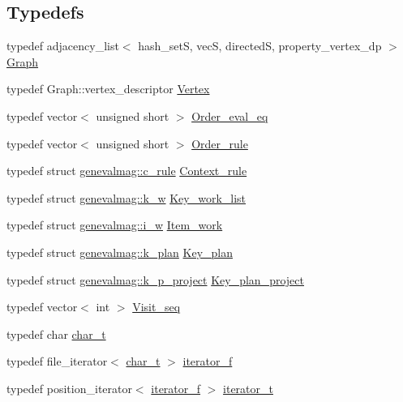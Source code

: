 \subsection*{Typedefs}
\begin{CompactItemize}
\item 
typedef adjacency\_\-list$<$ hash\_\-setS, vecS, directedS, property\_\-vertex\_\-dp $>$ \hyperlink{namespacegenevalmag_4a96de9ebfc7d48233406ab9cad55cb5}{Graph}
\item 
typedef Graph::vertex\_\-descriptor \hyperlink{namespacegenevalmag_2aae7b018fc2a9afae131bbf639181b5}{Vertex}
\item 
typedef vector$<$ unsigned short $>$ \hyperlink{namespacegenevalmag_0bb2e8b0fa1b07b873f0363719de7b64}{Order\_\-eval\_\-eq}
\item 
typedef vector$<$ unsigned short $>$ \hyperlink{namespacegenevalmag_ed20da32fb9692645ae53d911d274fd5}{Order\_\-rule}
\item 
typedef struct \hyperlink{structgenevalmag_1_1c__rule}{genevalmag::c\_\-rule} \hyperlink{namespacegenevalmag_59ad19d59075a158ceb18d55009ce9a7}{Context\_\-rule}
\item 
typedef struct \hyperlink{structgenevalmag_1_1k__w}{genevalmag::k\_\-w} \hyperlink{namespacegenevalmag_457ae083d404303792f6086cf82a1c59}{Key\_\-work\_\-list}
\item 
typedef struct \hyperlink{structgenevalmag_1_1i__w}{genevalmag::i\_\-w} \hyperlink{namespacegenevalmag_bb601d42781f0764762a8e5a8ded19c6}{Item\_\-work}
\item 
typedef struct \hyperlink{structgenevalmag_1_1k__plan}{genevalmag::k\_\-plan} \hyperlink{namespacegenevalmag_9cb3d5a3c6e368bf7a12efbc09f71048}{Key\_\-plan}
\item 
typedef struct \hyperlink{structgenevalmag_1_1k__p__project}{genevalmag::k\_\-p\_\-project} \hyperlink{namespacegenevalmag_ce502fedfb5a14e31d5d20b0d35b807d}{Key\_\-plan\_\-project}
\item 
typedef vector$<$ int $>$ \hyperlink{namespacegenevalmag_7720677d79b33ecca4db21cdbcf7908f}{Visit\_\-seq}
\item 
typedef char \hyperlink{namespacegenevalmag_63d49b2e7b123ae54a8fdc03bcbde116}{char\_\-t}
\item 
typedef file\_\-iterator$<$ \hyperlink{namespacegenevalmag_63d49b2e7b123ae54a8fdc03bcbde116}{char\_\-t} $>$ \hyperlink{namespacegenevalmag_068de0c39bd97e0f3fe3e3c805632e4b}{iterator\_\-f}
\item 
typedef position\_\-iterator$<$ \hyperlink{namespacegenevalmag_068de0c39bd97e0f3fe3e3c805632e4b}{iterator\_\-f} $>$ \hyperlink{namespacegenevalmag_64946721fb97e58be670a468bf8e7056}{iterator\_\-t}
\end{CompactItemize}
